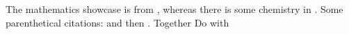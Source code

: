 \documentclass{article}
\begin{document}
The mathematics showcase is from \citet{Graham1995}, whereas
there is some chemistry in \citet{Thomas2008}.
Some parenthetical citations: \citep{Graham1995}
and then \citep[p.~56]{Thomas2008}.
\citep[See][pp.~45--48]{Graham1995}
Together \citep{Graham1995,Thomas2008}
Do with \citet{posobie}



\end{document}
